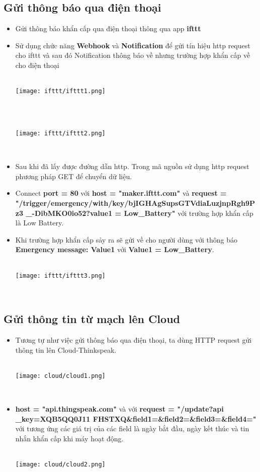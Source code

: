 \documentclass[12pt, a4paper]{article}
\begin{document}
\subsection{Gửi thông báo qua điện thoại}
\begin{itemize}
    \item Gửi thông báo khẩn cấp qua điện thoại thông qua app \textbf{ifttt}
    \item Sử dụng chức năng \textbf{Webhook} và \textbf{Notification} để gửi tín hiệu http request cho ifttt và sau đó Notification thông báo về nhưng trường hợp khẩn cấp về cho điện thoại \\ \\
    \centerline{\texttt{[image: ifttt/ifttt1.png]}} \\ \\
    \centerline{\texttt{[image: ifttt/ifttt2.png]}} \\ 
    \item Sau khi đã lấy được đường dẫn http. Trong mã nguồn sử dụng http request phương pháp GET để chuyển dữ liệu.
    \item Connect \textbf{port = 80} với \textbf{host = "maker.ifttt.com"} và \textbf{request = "/trigger/emergency/with/key/bjIGHAgSupsGTVdiaLuzjnpRgh9Pz3 \_-DibMKO0io52?}\textbf{value1 = Low\_Battery"} với trường hợp khẩn cấp là Low Battery.
    \item Khi trường hợp khẩn cấp sảy ra sẽ gửi về cho người dùng với thông báo \textbf{Emergency message: {{Value1}}} với \textbf{Value1 = Low\_Battery}. \\ \\
    \centerline{\texttt{[image: ifttt/ifttt3.png]}} \\ 
\end{itemize}
\subsection{Gửi thông tin từ mạch lên Cloud}
\begin{itemize}
    \item Tương tự như việc gửi thông báo qua điện thoại, ta dùng HTTP request gửi thông  tin lên Cloud-Thinkspeak.\\ \\
    \centerline{\texttt{[image: cloud/cloud1.png]}} \\ 
    \item \textbf{host = "api.thingspeak.com"} và với \textbf{request = "/update?api \_key=XQB5QQ0J11 FHSTXQ\&field1=\&field2=\&field3=\&field4="} với tương ứng các giá trị của các field là ngày bắt đầu, ngày kết thúc và tin nhắn khẩn cấp khi máy hoạt động. \\ \\
    \centerline{\texttt{[image: cloud/cloud2.png]}} \\ 
\end{itemize}
\end{document}
